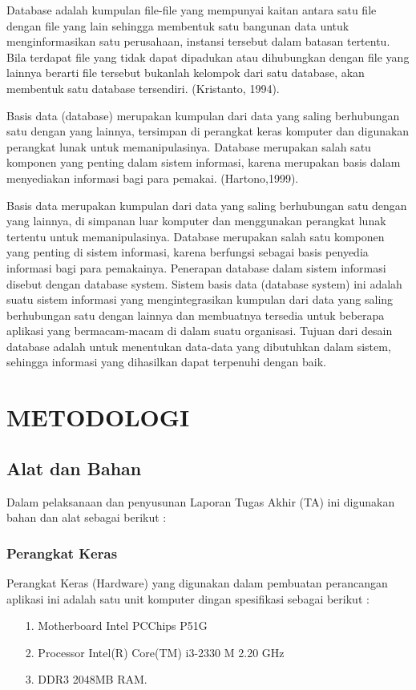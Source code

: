 \documentclass{jtetiproposalskripsi}
\begin{document}
Database adalah kumpulan file-file yang mempunyai kaitan antara satu file dengan file yang lain sehingga membentuk satu bangunan data untuk menginformasikan satu perusahaan, instansi tersebut dalam batasan tertentu. Bila terdapat file yang tidak dapat dipadukan atau dihubungkan dengan file yang lainnya berarti file tersebut bukanlah kelompok dari satu database, akan membentuk satu database tersendiri. (Kristanto, 1994).
	
Basis data (database) merupakan kumpulan dari data yang saling berhubungan satu dengan yang lainnya, tersimpan di perangkat keras komputer dan digunakan perangkat lunak untuk memanipulasinya. Database merupakan salah satu komponen yang penting dalam sistem informasi, karena merupakan basis dalam menyediakan informasi bagi para pemakai. (Hartono,1999).

Basis data merupakan kumpulan dari data yang saling berhubungan satu dengan yang lainnya, di simpanan luar komputer dan menggunakan perangkat lunak tertentu untuk memanipulasinya. Database merupakan salah  satu komponen yang penting di sistem informasi, karena berfungsi sebagai  basis penyedia informasi bagi para pemakainya. Penerapan database dalam  sistem informasi disebut dengan database system. Sistem basis data (database system) ini adalah suatu sistem informasi yang mengintegrasikan kumpulan dari data yang saling berhubungan satu dengan lainnya dan membuatnya tersedia untuk beberapa aplikasi yang bermacam-macam di dalam  suatu organisasi. Tujuan dari desain database adalah untuk menentukan data-data yang dibutuhkan dalam sistem, sehingga informasi yang dihasilkan dapat terpenuhi dengan baik.


\chapter{METODOLOGI}

\section{Alat dan Bahan}

Dalam pelaksanaan dan penyusunan Laporan Tugas Akhir (TA) ini digunakan bahan dan alat sebagai berikut :
\subsection{Perangkat Keras}
Perangkat Keras (Hardware) yang digunakan dalam pembuatan perancangan aplikasi ini adalah satu unit komputer dingan spesifikasi sebagai berikut :
\begin{itemize}
\item[1.] Motherboard Intel PCChips P51G
\item[2.] Processor Intel(R) Core(TM) i3-2330 M 2.20 GHz
\item[3.] DDR3 2048MB RAM.
\end{itemize}
\end{document}
